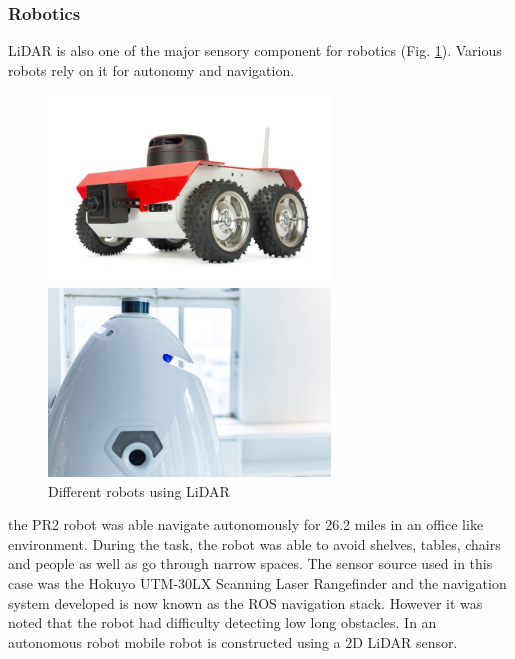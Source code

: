 \subsubsection*{Robotics}
\ac{LiDAR} is also one of the major sensory component for robotics (Fig. \ref{fig:robotslidar}). Various robots rely on it for autonomy and navigation.
\begin{figure}[h] 
    \begin{minipage}[b]{.49\linewidth}
        \includegraphics[height=5cm,width=\linewidth]{imgs/chapter2/robot1.jpg}
    \end{minipage}
    \begin{minipage}[b]{.49\linewidth}
        \includegraphics[height=5cm,width=\linewidth]{imgs/chapter2/robot2.jpg}
    \end{minipage}
    \caption{Different robots using \ac{LiDAR}}
    \label{fig:robotslidar}
\end{figure}
\cite{marder2010office}  the PR2 robot was able navigate autonomously for 26.2 miles in an office like environment. During the task, the robot was able to avoid  shelves, tables, chairs and people as well as go
through narrow spaces. The sensor source used in this case was the Hokuyo UTM-30LX Scanning Laser Rangefinder and the navigation system developed is now known as the \ac{ROS} navigation stack. However it was noted that the robot had difficulty detecting low long obstacles.
In \cite{lidar2019ros} an autonomous robot mobile robot is constructed  using a 2D \ac{LiDAR} sensor. 


